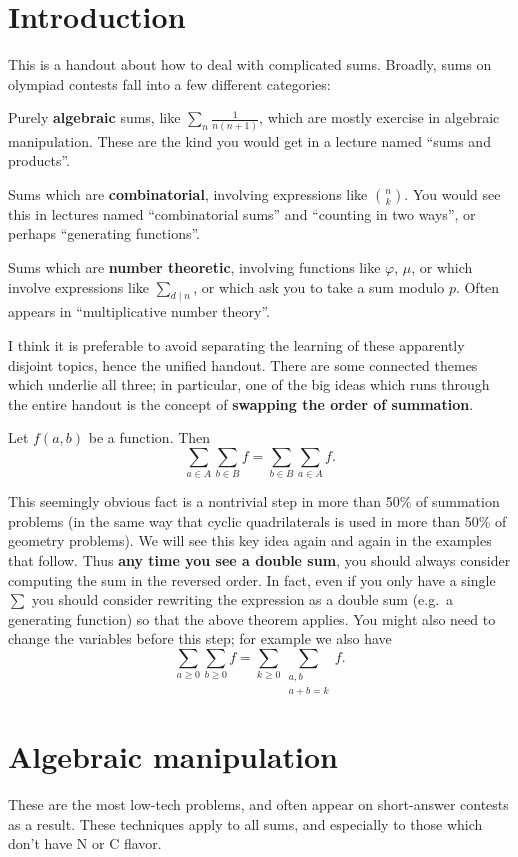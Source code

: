 \documentclass[11pt]{scrartcl}
\begin{document}
\section{Introduction}
This is a handout about how to deal with complicated sums.
Broadly, sums on olympiad contests fall into a few different categories:
\begin{itemize}
  \ii Purely \textbf{algebraic} sums, like $\sum_n \frac{1}{n(n+1)}$,
  which are mostly exercise in algebraic manipulation.
  These are the kind you would get in a lecture named ``sums and products''.

  \ii Sums which are \textbf{combinatorial}, involving expressions like $\binom nk$.
  You would see this in lectures named ``combinatorial sums''
  and ``counting in two ways'', or perhaps ``generating functions''.

  \ii Sums which are \textbf{number theoretic}, involving functions like
  $\varphi$, $\mu$, or which involve expressions like $\sum_{d \mid n}$,
  or which ask you to take a sum modulo $p$.
  Often appears in ``multiplicative number theory''.
\end{itemize}
I think it is preferable to avoid separating the learning of these
apparently disjoint topics, hence the unified handout.
There are some connected themes which underlie all three;
in particular, one of the big ideas which runs through the entire
handout is the concept of \textbf{swapping the order of summation}.
\begin{theorem}
  Let $f(a,b)$ be a function. Then
  \[ \sum_{a \in A} \sum_{b \in B} f = \sum_{b \in B} \sum_{a \in A} f. \]
\end{theorem}
This seemingly obvious fact is a nontrivial step in more than 50\%
of summation problems (in the same way that cyclic quadrilaterals is used
in more than 50\% of geometry problems).
We will see this key idea again and again in the examples that follow.
Thus \textbf{any time you see a double sum}, you should always consider
computing the sum in the reversed order.
In fact, even if you only have a single $\sum$ you should consider rewriting
the expression as a double sum (e.g.\ a generating function)
so that the above theorem applies.
You might also need to change the variables before this step; for example we also have
\[ \sum_{a \ge 0} \sum_{b \ge 0} f = \sum_{k \ge 0} \sum_{\substack{a,b \\ a+b=k}} f. \]


\section{Algebraic manipulation}
These are the most low-tech problems,
and often appear on short-answer contests as a result.
These techniques apply to all sums, and especially to those
which don't have N or C flavor.
\end{document}
